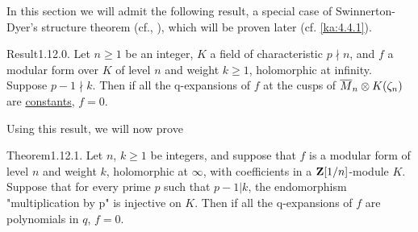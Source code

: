 
In this section we will admit the following result, a special case of
Swinnerton-Dyer's structure theorem (cf.\cite{serre73}, \cite{swinnerton-dyer-proceedings}), which will be proven later
(cf. \eqref{ka:4.4.1}).

\begin{kathm}{Result}{1.12.0.}
Let $n\geq 1$ be an integer, $K$ a field of characteristic $p\nmid n$, and $f$ a
modular form over $K$ of level $n$ and weight $k\geq 1$, holomorphic at
infinity. Suppose $p-1\nmid k$. Then if all the q-expansions of $f$ at the cusps
of $\overline{M}_n\otimes K(\zeta_n)$ are \uline{constants}, $f = 0$.
\end{kathm}

Using this result, we will now prove

\begin{kathm}{Theorem}{1.12.1.}
Let $n$, $k\geq 1$ be integers, and suppose that $f$ is a modular form of level
$n$ and weight $k$, holomorphic at $\infty$, with coefficients in a
$\mathbf{Z}[1/n]$-module $K$. Suppose that for every prime $p$ such that $p-1|k$, the
endomorphism "multiplication by p" is injective on $K$. Then if all the
q-expansions of $f$ are polynomials in $q$, $f = 0$.
\end{kathm}


